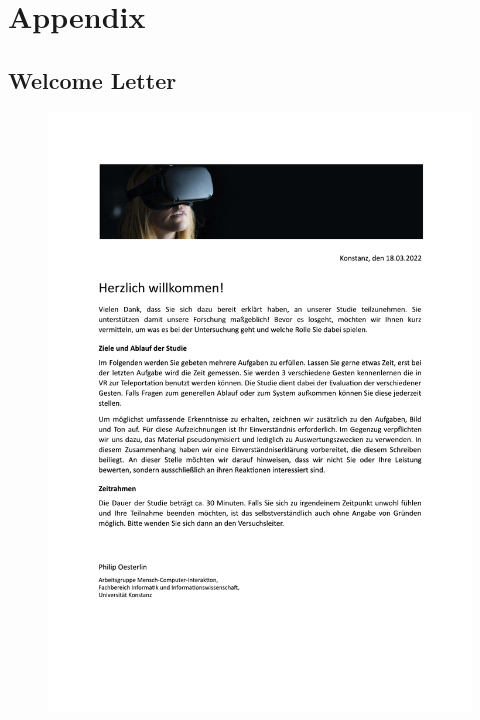 \chapter{Appendix}


\section{Welcome Letter}
\begin{figure}[hbt!]
\centering
\includegraphics[width=\textwidth]{figures/Appendix/welcome letter.pdf}
\end{figure}

